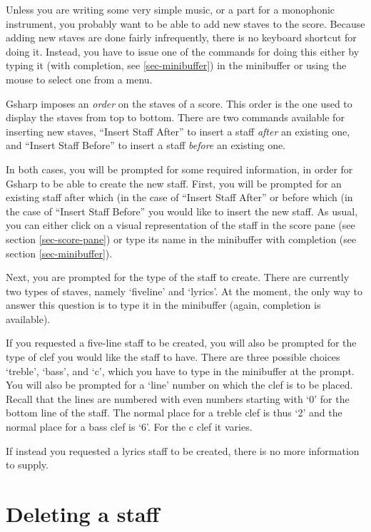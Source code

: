 \documentclass[11pt]{book}
\def\gs{Gsharp}
\def\command#1{``#1''}
\begin{document}
Unless you are writing some very simple music, or a part for a
monophonic instrument, you probably want to be able to add new staves
to the score. Because adding new staves are done fairly infrequently,
there is no keyboard shortcut for doing it.  Instead, you have to
issue one of the commands for doing this either by typing it (with
completion, see \ref{sec-minibuffer}) in the minibuffer or using
the mouse to select one from a menu.  

{\gs} imposes an \emph{order} on the staves of a score.  This order is
the one used to display the staves from top to bottom.  There are two
commands available for inserting new staves, \command{Insert Staff
  After} to insert a staff \emph{after} an existing one, and \command{Insert
  Staff Before} to insert a staff \emph{before} an existing one. 

In both cases, you will be prompted for some required information, in
order for {\gs} to be able to create the new staff.  First, you will
be prompted for an existing staff after which (in the case of
\command{Insert Staff After} or before which (in the case of
\command{Insert Staff Before} you would like to insert the new staff.
As usual, you can either click on a visual representation of the staff
in the score pane (see section \ref{sec-score-pane}) or type its name
in the minibuffer with completion (see section
\ref{sec-minibuffer}). 

Next, you are prompted for the type of the staff to create.  There are
currently two types of staves, namely `fiveline' and `lyrics'.  At the
moment, the only way to answer this question is to type it in the
minibuffer (again, completion is available). 

If you requested a five-line staff to be created, you will also be
prompted for the type of clef you would like the staff to have.  There
are three possible choices `treble', `bass', and `c', which you have
to type in the minibuffer at the prompt.  You will also be prompted
for a `line' number on which the clef is to be placed.  Recall that
the lines are numbered with even numbers starting with `0' for the
bottom line of the staff.  The normal place for a treble clef is thus
`2' and the normal place for a bass clef is `6'.  For the c clef it
varies. 

If instead you requested a lyrics staff to be created, there is no
more information to supply.

\section{Deleting a staff}
\end{document}

